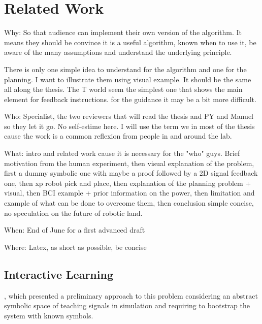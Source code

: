 \renewcommand{\chapterpath}{relatedwork}
\renewcommand{\imgpath}{\chapterpath/img}

\chapter{Related Work}
\label{chapter:relatedwork}
\minitoc


Why: So that audience can implement their own version of the algorithm. It means they should be convince it is a useful algorithm, known when to use it, be aware of the many assumptions and understand the underlying principle. 

There is only one simple idea to understand for the algorithm and one for the planning. I want to illustrate them using visual example. It should be the same all along the thesis. The T world seem the simplest one that shows the main element for feedback instructions. for the guidance it may be a bit more difficult.

Who: Specialist, the two reviewers that will read the thesis and PY and Manuel so they let it go. No self-estime here. I will use the term we in most of the thesis cause the work is a common reflexion from people in and around the lab.

What: intro and related work cause it is necessary for the "who" guys. Brief motivation from the human experiment, then visual explanation of the problem, first a dummy symbolic one with maybe a proof followed by a 2D signal feedback one, then xp robot pick and place, then explanation of the planning problem + visual, then BCI example + prior information on the power, then limitation and example of what can be done to overcome them, then conclusion simple concise, no speculation on the future of robotic land.

When: End of June for a first advanced draft

Where: Latex, as short as possible, be concise

\section{Interactive Learning}

\cite{macl11simul}, which presented a preliminary approach to this problem considering an abstract symbolic space of teaching signals in simulation and requiring to bootstrap the system with known symbols. 

